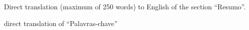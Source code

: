 
Direct translation (maximum of 250 words) to English of the section ``Resumo''.

\mbox{}\linebreak
{} direct translation of ``Palavras-chave''

